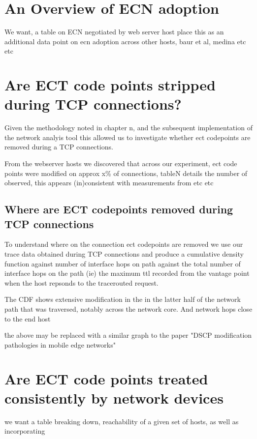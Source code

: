 \documentclass{l4proj}
\begin{document}
\section{An Overview of ECN adoption}

We want, a table on ECN negotiated by web server host
place this as an additional data point on ecn adoption across other hosts, baur et al, medina etc etc


\section{Are ECT code points stripped during TCP connections?}

Given the methodology noted in chapter n, and the subsequent implementation of the network analyis tool this allowed us to investigate whether ect codepoints are removed during a TCP connections.

From the webserver hosts we discovered that across our experiment, ect code points were modified on approx x\% of connections, tableN details the number of observed, this appears (in)consistent with measurements  from etc etc

\subsection{Where are ECT codepoints removed during TCP connections}

To understand where on the connection ect codepoints are removed we use our trace data obtained during TCP connections and produce a cumulative density function against number of interface hops on path against the total number of interface hops on the path (ie) the maximum ttl recorded from the vantage point when the host repsonds to the tracerouted request.

The CDF shows extensive modification in the in the latter half of the network path that was traversed, notably across the network core. And network hops close to the end host

\^ the above may be replaced with a similar graph to the paper "DSCP modification pathologies in mobile edge networks"

\section{Are ECT code points treated consistently by network devices}

we want a table breaking down, reachability of a given set of hosts, as well as incorporating
\end{document}

